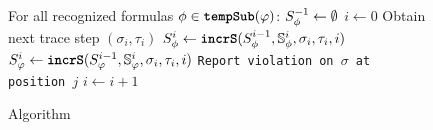 
\begin{figure}[t]
\begin{algorithmic}[1]
\STATE For all recognized formulas $\policyv \in \tempSub(\policy)$: $\histst[\policyv]{-1} \leftarrow \emptyset$
\STATE $i \leftarrow 0$
\LOOP
\STATE Obtain next trace step $(\sigma_i, \tau_i)$
	\STATE $\histst[\policyv]{i} \leftarrow \incrS(\histst[\policyv]{i-1}, \histSt[\policyv]{i}, \sigma_i, \tau_i, i)$
\ENDFOR
\STATE $\histst{i} \leftarrow \incrS(\histst{i-1}, \histSt{i}, \sigma_i, \tau_i, i)$
\STATE \texttt{Report violation on $\sigma$ at position $j$}
\ENDFOR
\STATE $i \leftarrow i + 1$
\ENDLOOP
\end{algorithmic}
\caption{\monitor Algorithm}\label{fig:algorithm}
\end{figure}

